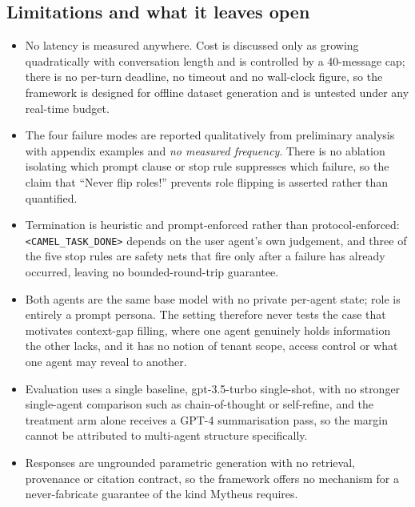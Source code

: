 \subsection{Limitations and what it leaves open}
\begin{itemize}[leftmargin=*, itemsep=1pt, topsep=2pt]
\item No latency is measured anywhere. Cost is discussed only as growing quadratically with conversation length and is controlled by a 40-message cap; there is no per-turn deadline, no timeout and no wall-clock figure, so the framework is designed for offline dataset generation and is untested under any real-time budget.
\item The four failure modes are reported qualitatively from preliminary analysis with appendix examples and \emph{no measured frequency}. There is no ablation isolating which prompt clause or stop rule suppresses which failure, so the claim that ``Never flip roles!'' prevents role flipping is asserted rather than quantified.
\item Termination is heuristic and prompt-enforced rather than protocol-enforced: \texttt{<CAMEL\_TASK\_DONE>} depends on the user agent's own judgement, and three of the five stop rules are safety nets that fire only after a failure has already occurred, leaving no bounded-round-trip guarantee.
\item Both agents are the same base model with no private per-agent state; role is entirely a prompt persona. The setting therefore never tests the case that motivates context-gap filling, where one agent genuinely holds information the other lacks, and it has no notion of tenant scope, access control or what one agent may reveal to another.
\item Evaluation uses a single baseline, gpt-3.5-turbo single-shot, with no stronger single-agent comparison such as chain-of-thought or self-refine, and the treatment arm alone receives a GPT-4 summarisation pass, so the margin cannot be attributed to multi-agent structure specifically.
\item Responses are ungrounded parametric generation with no retrieval, provenance or citation contract, so the framework offers no mechanism for a never-fabricate guarantee of the kind Mytheus requires.
\end{itemize}
